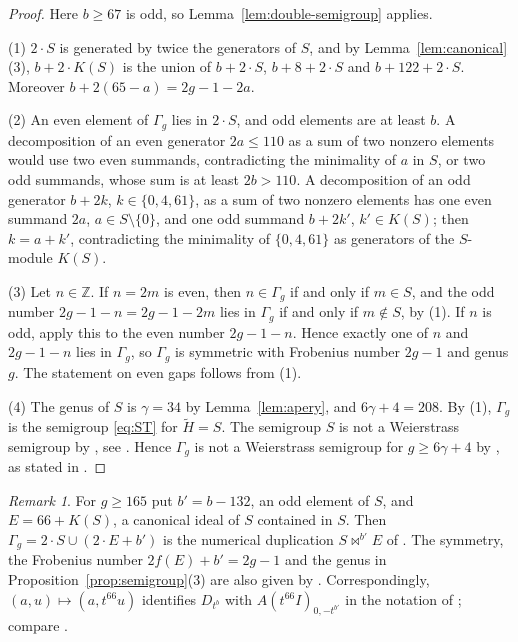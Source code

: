 \documentclass{amsart}
\theoremstyle{definition}
\theoremstyle{remark}
\newtheorem{remark}[theorem]{Remark}
\numberwithin{equation}{section}
\newcommand{\Z}{\mathbb{Z}}
\begin{document}
\begin{proof}
Here $b\ge67$ is odd, so Lemma~\ref{lem:double-semigroup} applies.

(1) $2\cdot S$ is generated by twice the generators of $S$, and by Lemma~\ref{lem:canonical}(3), $b+2\cdot K(S)$ is the union of $b+2\cdot S$, $b+8+2\cdot S$ and $b+122+2\cdot S$. Moreover $b+2(65-a)=2g-1-2a$.

(2) An even element of $\Gamma_g$ lies in $2\cdot S$, and odd elements are at least $b$. A decomposition of an even generator $2a\le110$ as a sum of two nonzero elements would use two even summands, contradicting the minimality of $a$ in $S$, or two odd summands, whose sum is at least $2b>110$. A decomposition of an odd generator $b+2k$, $k\in\{0,4,61\}$, as a sum of two nonzero elements has one even summand $2a$, $a\in S\setminus\{0\}$, and one odd summand $b+2k'$, $k'\in K(S)$; then $k=a+k'$, contradicting the minimality of $\{0,4,61\}$ as generators of the $S$-module $K(S)$.

(3) Let $n\in\Z$. If $n=2m$ is even, then $n\in\Gamma_g$ if and only if $m\in S$, and the odd number $2g-1-n=2g-1-2m$ lies in $\Gamma_g$ if and only if $m\notin S$, by (1). If $n$ is odd, apply this to the even number $2g-1-n$. Hence exactly one of $n$ and $2g-1-n$ lies in $\Gamma_g$, so $\Gamma_g$ is symmetric with Frobenius number $2g-1$ and genus $g$. The statement on even gaps follows from (1).

(4) The genus of $S$ is $\gamma=34$ by Lemma~\ref{lem:apery}, and $6\gamma+4=208$. By (1), $\Gamma_g$ is the semigroup \eqref{eq:ST} for $\tilde H=S$. The semigroup $S$ is not a Weierstrass semigroup by \cite[Example~5.1]{Kom}, see \cite[Example~2.13]{Ste}. Hence $\Gamma_g$ is not a Weierstrass semigroup for $g\ge6\gamma+4$ by \cite[p.~48, proof of Scholium~3.5 and Remark~3.6]{Tor}, as stated in \cite[\S 4.1]{Ste}.
\end{proof}

\begin{remark}\label{rem:duplication}
For $g\ge165$ put $b'=b-132$, an odd element of $S$, and $E=66+K(S)$, a canonical ideal of $S$ contained in $S$. Then $\Gamma_g=2\cdot S\cup(2\cdot E+b')$ is the numerical duplication $S\bowtie^{b'}E$ of \cite[\S 2]{DS}. The symmetry, the Frobenius number $2f(E)+b'=2g-1$ and the genus in Proposition~\ref{prop:semigroup}(3) are also given by \cite[Proposition~2.1]{DS}. Correspondingly, $(a,u)\mapsto(a,t^{66}u)$ identifies $D_{t^b}$ with $A(t^{66}I)_{0,-t^{b'}}$ in the notation of \cite{BDS}; compare \cite[Theorem~3.4]{BDS}.
\end{remark}
\end{document}
